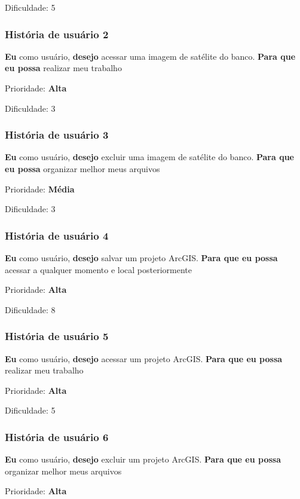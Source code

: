     Dificuldade: 5

  \subsubsection{História de usuário 2}

    \textbf{Eu} como usuário, \textbf{desejo} acessar uma imagem de satélite do banco. \textbf{Para que eu possa} realizar meu trabalho

    Prioridade: \textbf{Alta}

    Dificuldade: 3

  \subsubsection{História de usuário 3}

    \textbf{Eu} como usuário, \textbf{desejo} excluir uma imagem de satélite do banco. \textbf{Para que eu possa} organizar melhor meus arquivos

    Prioridade: \textbf{Média}

    Dificuldade: 3

  \subsubsection{História de usuário 4}
    \textbf{Eu} como usuário, \textbf{desejo} salvar um projeto ArcGIS. \textbf{Para que eu possa} acessar a qualquer momento e local posteriormente

    Prioridade: \textbf{Alta}

    Dificuldade: 8

  \subsubsection{História de usuário 5}
    \textbf{Eu} como usuário, \textbf{desejo} acessar um projeto ArcGIS. \textbf{Para que eu possa} realizar meu trabalho

    Prioridade: \textbf{Alta}

    Dificuldade: 5

  \subsubsection{História de usuário 6}
    \textbf{Eu} como usuário, \textbf{desejo} excluir um projeto ArcGIS. \textbf{Para que eu possa} organizar melhor meus arquivos

    Prioridade: \textbf{Alta}

